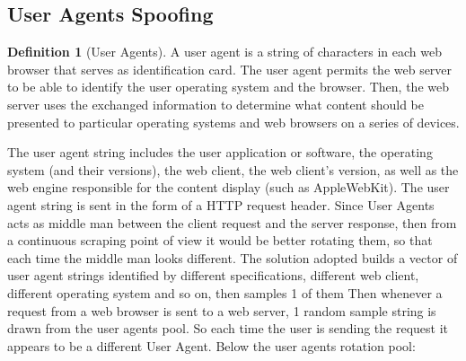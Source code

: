 \documentclass[
  12pt,
  a4paper,
  oneside]{book}
\theoremstyle{definition}
\newtheorem{definition}{Definition}[chapter]
\theoremstyle{definition}
\theoremstyle{definition}
\theoremstyle{remark}
\begin{document}
\hypertarget{spoofing}{%
\subsection{User Agents Spoofing}\label{spoofing}}

\begin{definition}[User Agents]
\protect\hypertarget{def:useragents}{}{\label{def:useragents} {} }A user agent \citep{whoishostingthis.com} is a string of characters in each web browser that serves as identification card. The user agent permits the web server to be able to identify the user operating system and the browser. Then, the web server uses the exchanged information to determine what content should be presented to particular operating systems and web browsers on a series of devices.
\end{definition}

The user agent string includes the user application or software, the operating system (and their versions), the web client, the web client's version, as well as the web engine responsible for the content display (such as AppleWebKit). The user agent string is sent in the form of a HTTP request header. Since User Agents acts as middle man between the client request and the server response, then from a continuous scraping point of view it would be better rotating them, so that each time the middle man looks different. The solution adopted builds a vector of user agent strings identified by different specifications, different web client, different operating system and so on, then samples 1 of them
Then whenever a request from a web browser is sent to a web server, 1 random sample string is drawn from the user agents pool. So each time the user is sending the request it appears to be a different User Agent.
Below the user agents rotation pool:
\end{document}
